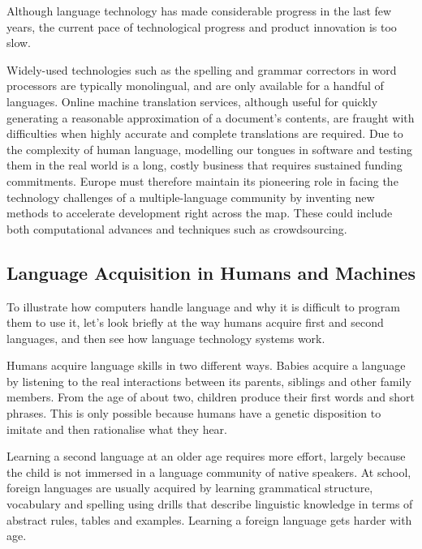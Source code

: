 \begin{multicols}{2}
Although language technology has made considerable progress in the last few years, the current pace of technological progress and product innovation is too slow. 

Widely-used technologies such as the spelling and grammar correctors in word processors are typically monolingual, and are only available for a handful of languages. Online machine translation services, although useful for quickly generating a reasonable approximation of a document’s contents, are fraught with difficulties when highly accurate and complete translations are required. Due to the complexity of human language, modelling our tongues in software and testing them in the real world is a long, costly business that requires sustained funding commitments. Europe must therefore maintain its pioneering role in facing the technology challenges of a multiple-language community by inventing new methods to accelerate development right across the map. These could include both computational advances and techniques such as crowdsourcing.


\subsection{Language Acquisition in Humans and Machines}

    To illustrate how computers handle language and why it is difficult to program them to use it, let’s look briefly at the way humans acquire first and second languages, and then see how language technology systems work. 

    Humans acquire language skills in two different ways. Babies acquire a language by listening to the real interactions between its parents, siblings and other family members. From the age of about two, children produce their first words and short phrases. This is only possible because humans have a genetic disposition to imitate and then rationalise what they hear. 


    Learning a second language at an older age requires more effort, largely because the child is not immersed in a language community of native speakers. At school, foreign languages are usually acquired by learning grammatical structure, vocabulary and spelling using drills that describe linguistic knowledge in terms of abstract rules, tables and examples. Learning a foreign language gets harder with age.


\end{multicols}
